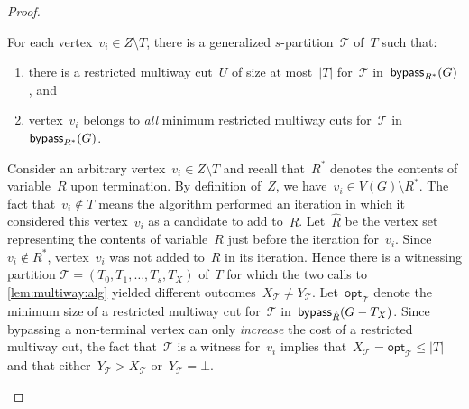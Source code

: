 \begin{proof}
\begin{claim} \label{claim:z:essential:g}
For each vertex~$v_i \in Z \setminus T$, there is a generalized $s$-partition~$\mathcal{T}$ of~$T$ such that:
\begin{enumerate}
	\item there is a restricted multiway cut~$U$ of size at most~$|T|$ for~$\mathcal{T}$ in~$\mathsf{bypass}_{R^*}(G)$, and
	\item vertex~$v_i$ belongs to \emph{all} minimum restricted multiway cuts for~$\mathcal{T}$ in~$\mathsf{bypass}_{R^*}(G)$.
\end{enumerate}
\end{claim}
\begin{claimproof}
Consider an arbitrary vertex~$v_i \in Z \setminus T$ and recall that~$R^*$ denotes the contents of variable~$R$ upon termination. By definition of~$Z$, we have~$v_i \in V(G) \setminus R^*$. The fact that~$v_i \notin T$ means the algorithm performed an iteration in which it considered this vertex~$v_i$ as a candidate to add to~$R$. Let~$\hat{R}$ be the vertex set representing the contents of variable~$R$ just before the iteration for~$v_i$. Since~$v_i \notin R^*$, vertex~$v_i$ was not added to~$R$ in its iteration. Hence there is a witnessing partition $\mathcal{T} = (T_0, T_1, \ldots, T_s, T_X)$ of~$T$ for which the two calls to \cref{lem:multiway:alg} yielded different outcomes~$X_{\mathcal{T}} \neq Y_{\mathcal{T}}$. Let~$\mathsf{opt}_{\mathcal{T}}$ denote the minimum size of a restricted multiway cut for~$\mathcal{T}$ in~$\mathsf{bypass}_{\hat{R}}(G - T_X)$. Since bypassing a non-terminal vertex can only \emph{increase} the cost of a restricted multiway cut, the fact that~$\mathcal{T}$ is a witness for~$v_i$ implies that~$X_\mathcal{T} = \mathsf{opt}_{\mathcal{T}} \leq |T|$ and that either~$Y_{\mathcal{T}} > X_{\mathcal{T}}$ or~$Y_{\mathcal{T}} = \bot$.


\end{claimproof}
\end{proof}
